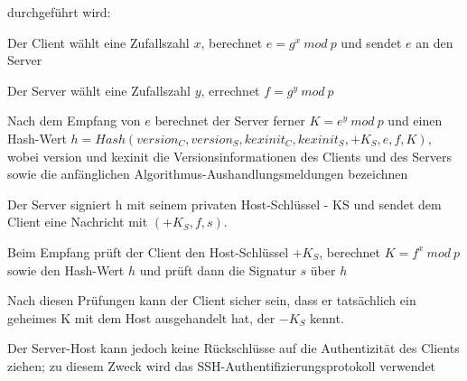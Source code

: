 \documentclass[a4paper]{article}
\begin{document}
\begin{multicols}{3}
\begin{itemize*}
\begin{itemize*}
                  durchgeführt wird:
                  \begin{itemize*}
                        \item Der Client wählt eine Zufallszahl $x$, berechnet $e=g^x\ mod\ p$ und sendet $e$ an den Server
                        \item Der Server wählt eine Zufallszahl $y$, errechnet $f=g^y\ mod\ p$
                        \item Nach dem Empfang von $e$ berechnet der Server ferner $K=e^y\ mod\ p$ und einen Hash-Wert $h = Hash(version_C, version_S, kexinit_C, kexinit_S, +K_S, e, f, K)$, wobei version und kexinit die Versionsinformationen des Clients und des Servers sowie die anfänglichen Algorithmus-Aushandlungsmeldungen bezeichnen
                        \item Der Server signiert h mit seinem privaten Host-Schlüssel - KS und sendet dem Client eine Nachricht mit $(+K_S, f, s)$.
                        \item Beim Empfang prüft der Client den Host-Schlüssel $+K_S$, berechnet $K=f^x\ mod\ p$ sowie den Hash-Wert $h$ und prüft dann die Signatur $s$ über $h$
                  \end{itemize*}
                  \item Nach diesen Prüfungen kann der Client sicher sein, dass er tatsächlich
                  ein geheimes K mit dem Host ausgehandelt hat, der $-K_S$ kennt.
                  \item Der Server-Host kann jedoch keine Rückschlüsse auf die Authentizität
                  des Clients ziehen; zu diesem Zweck wird das
                  SSH-Authentifizierungsprotokoll verwendet
            \end{itemize*}


\end{itemize*}
\end{multicols}
\end{document}
